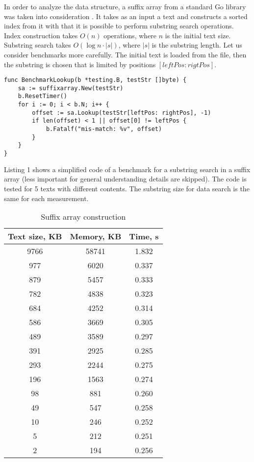 
In order to analyze the data structure, a suffix array from a standard Go library
was taken into consideration \cite{golang2016sa}. It takes as an input
a text and constructs a sorted index from it with that it is possible to perform
substring search operations. Index construction takes $O(n)$ operations, where $n$ is
the initial text size. Substring search takes $O(\log n \cdot |s|)$, where $|s|$ is the substring length.
Let us consider benchmarks more carefully. The initial text is loaded from the file,
then the substring is chosen that is limited by positions $[leftPos:rigtPos]$.

\begin{lstlisting}[caption=Suffix array example]
func BenchmarkLookup(b *testing.B, testStr []byte) {
    sa := suffixarray.New(testStr)
    b.ResetTimer()
    for i := 0; i < b.N; i++ {
        offset := sa.Lookup(testStr[leftPos: rightPos], -1)
        if len(offset) < 1 || offset[0] != leftPos {
            b.Fatalf("mis-match: %v", offset)
        }
    }
}
\end{lstlisting}

Listing 1 shows a simplified code of a benchmark for a substring search in a suffix array
(less important for general understanding details are skipped). The code is tested for 5 texts with
different contents. The substring size for data search is the same for each measurement.

\begin{table}[ht!]
    \centering
    \begin{tabular}{|c|c|c|}
        \hline
        Text size, KB & Memory, KB & Time, s\\
        \hline
        9766 & 58741 & 1.832\\
        \hline
        977 & 6020 & 0.337\\
        \hline
        879 & 5457 & 0.333\\
        \hline
        782 & 4838 & 0.323\\
        \hline
        684 & 4252 & 0.314\\
        \hline
        586 & 3669 & 0.305\\
        \hline
        489 & 3589 & 0.297\\
        \hline
        391 & 2925 & 0.285\\
        \hline
        293 & 2244 & 0.275\\
        \hline
        196 & 1563 & 0.274\\
        \hline
        98 & 881 & 0.260\\
        \hline
        49 & 547 & 0.258\\
        \hline
        10 & 246 & 0.252\\
        \hline
        5 & 212 & 0.251\\
        \hline
        2 & 194 & 0.256\\
        \hline
    \end{tabular}
    \caption{Suffix array construction}
    \label{table:2}
\end{table}

